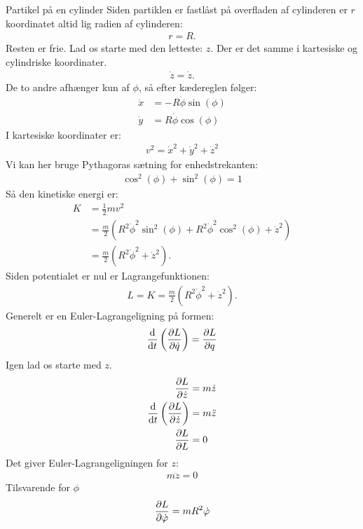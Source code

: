 \documentclass[crop=false, class=memoir]{standalone}
\begin{document}
\begin{opgave}[2]{Partikel på en cylinder}
%
\opg Siden partiklen er fastlåst på overfladen af cylinderen er $r$ koordinatet altid lig radien af cylinderen:
%
\begin{align}
	r = R.
\end{align}
%
Resten er frie.
%
\opg Lad os starte med den letteste: $z$. Der er det samme i kartesiske og cylindriske koordinater.
%
\begin{align}
	\dot{z} = \dot{z}.
\end{align}
%
De to andre afhænger kun af $\phi$, så efter kædereglen følger:
%
\begin{align*}
	\dot{x} &= -R\dot{\phi} \sin(\phi)\\
	\dot{y} &= R\dot{\phi} \cos(\phi)
\end{align*}
%
\opg I kartesiske koordinater er:
%
\begin{align}
    v^2 = \dot{x}^2 + \dot{y}^2 + \dot{z}^2
\end{align}
%
Vi kan her bruge Pythagoras sætning for enhedstrekanten:
%
\begin{align}
	\cos^2(\phi)+\sin^2(\phi) = 1
\end{align}
%
Så den kinetiske energi er:
%
\begin{align*}
	K &= \frac{1}{2}mv^2 \\
	&= \frac{m}{2}(R^2\dot{\phi}^2\sin^2(\phi)+R^2\dot{\phi}^2\cos^2(\phi)+\dot{z}^2)\\
	&= \frac{m}{2}(R^2\dot{\phi}^2+\dot{z}^2).
\end{align*}
%
\opg Siden potentialet er nul er Lagrangefunktionen:
%
\begin{align}
	L = K = \frac{m}{2}(R^2\dot{\phi}^2+\dot{z}^2).
\end{align}
%
\opg Generelt er en Euler-Lagrangeligning på formen:
%
\begin{align}
	\dv{}{t}\left(\pdv{L}{\dot{q}}\right) = \pdv{L}{q}
\end{align}
%
Igen lad os starte med $z$.
%
\begin{align*}
	\pdv{L}{\dot{z}} &= m\dot{z}\\
	\dv{}{t}\left(\pdv{L}{\dot{z}}\right) &= m\ddot{z}\\
	\pdv{L}{L} &= 0
\end{align*}
%
Det giver Euler-Lagrangeligningen for $z$:
%
\begin{align}
	m\ddot{z} = 0
\end{align}
%
Tilsvarende for $\phi$
%
\begin{align*}
	\pdv{L}{\dot{\phi}} &= mR^2\dot{\phi}\\

\end{align*}
\end{opgave}
\end{document}
